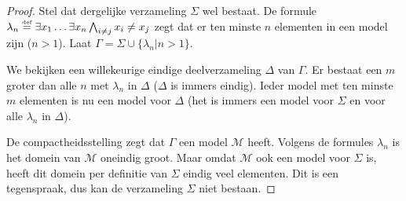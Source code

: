 \documentclass[a4paper,11pt]{article}
\begin{document}
\begin{proof}
Stel dat dergelijke verzameling $\Sigma$ wel bestaat. De formule
$\lambda_{n} \overset{\text{\tiny{def}}}{=} \exists x_{1} \ldots \exists x_{n} \bigwedge_{i \ne j} x_{i} \ne x_{j}$
zegt dat er ten minste $n$ elementen in een model zijn ($n > 1$). Laat
$\Gamma = \Sigma \cup \{\lambda_{n} | n>1\}$.

We bekijken een willekeurige eindige deelverzameling $\Delta$ van $\Gamma$. Er
bestaat een $m$ groter dan alle $n$ met $\lambda_{n}$ in $\Delta$ ($\Delta$ is
immers eindig). Ieder model met ten minste $m$ elementen is nu een model voor
$\Delta$ (het is immers een model voor $\Sigma$ en voor alle $\lambda_{n}$ in
$\Delta$).

De compactheidsstelling zegt dat $\Gamma$ een model $\mathcal{M}$ heeft.
Volgens de formules $\lambda_{n}$ is het domein van $\mathcal{M}$ oneindig
groot. Maar omdat $\mathcal{M}$ ook een model voor $\Sigma$ is, heeft dit domein
per definitie van $\Sigma$ eindig veel elementen. Dit is een tegenspraak, dus
kan de verzameling $\Sigma$ niet bestaan.
\end{proof}
\end{document}
